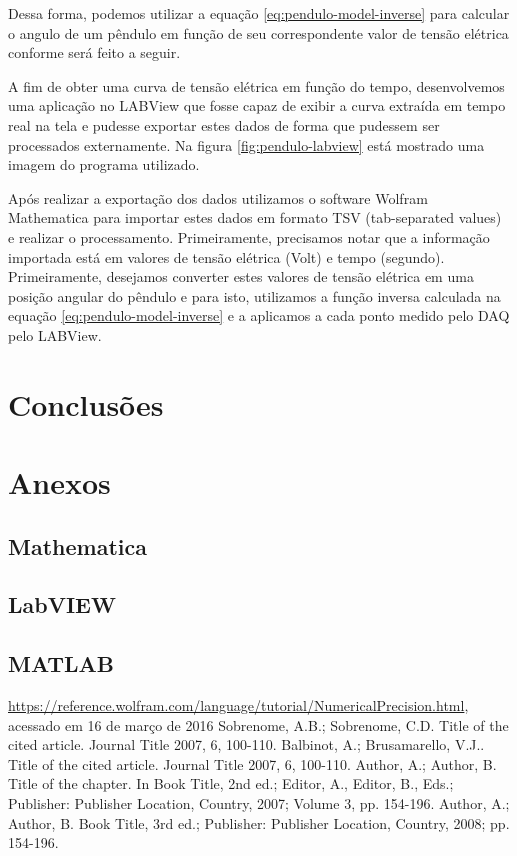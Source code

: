 \documentclass[12pt,a4paper]{instrumentacao}
\begin{document}
Dessa forma, podemos utilizar a equação \ref{eq:pendulo-model-inverse} para calcular o angulo de um pêndulo em função de seu correspondente valor de tensão elétrica conforme será feito a seguir.

A fim de obter uma curva de tensão elétrica em função do tempo, desenvolvemos uma aplicação no LABView que fosse capaz de exibir a curva extraída em tempo real na tela e pudesse exportar estes dados de forma que pudessem ser processados externamente. Na figura \ref{fig:pendulo-labview} está mostrado uma imagem do programa utilizado.


Após realizar a exportação dos dados utilizamos o software Wolfram Mathematica para importar estes dados em formato TSV (tab-separated values) e realizar o processamento. Primeiramente, precisamos notar que a informação importada está em valores de tensão elétrica (Volt) e tempo (segundo). Primeiramente, desejamos converter estes valores de tensão elétrica em uma posição angular do pêndulo e para isto, utilizamos a função inversa calculada na equação \ref{eq:pendulo-model-inverse} e a aplicamos a cada ponto medido pelo DAQ pelo LABView.



\chapter{Conclusões}

\chapter*{Anexos}
\section{Mathematica}

\section{LabVIEW}

\section{MATLAB}

\begin{thebibliography}{9}
 \url{https://reference.wolfram.com/language/tutorial/NumericalPrecision.html}, acessado em 16 de março de 2016
 Sobrenome, A.B.; Sobrenome, C.D. Title of the cited article. Journal Title 2007, 6, 100-110. 
 Balbinot, A.; Brusamarello, V.J.. Title of the cited article. Journal Title 2007, 6, 100-110. 
 Author, A.; Author, B. Title of the chapter. In Book Title, 2nd ed.; Editor, A., Editor, B., Eds.; Publisher: Publisher Location, Country, 2007; Volume 3, pp. 154-196.
 Author, A.; Author, B. Book Title, 3rd ed.; Publisher: Publisher Location, Country, 2008; 
pp. 154-196.

\end{thebibliography}
\end{document}
